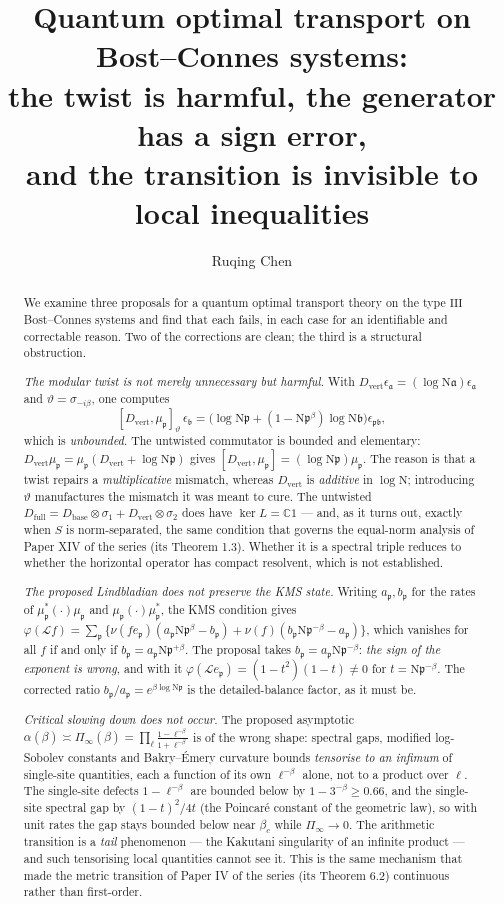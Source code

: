 \documentclass[11pt]{amsart}
\title[Twists, detailed balance, and tensorisation]{Quantum optimal transport on Bost--Connes systems:\\ the twist is harmful, the generator has a sign error,\\ and the transition is invisible to local inequalities}
\author{Ruqing Chen}
\date{}
\numberwithin{equation}{section}
\theoremstyle{definition}
\theoremstyle{remark}
\newcommand{\C}{\mathbb{C}}
\newcommand{\cL}{\mathcal{L}}
\newcommand{\pp}{\mathfrak{p}}
\newcommand{\aaa}{\mathfrak{a}}
\newcommand{\bb}{\mathfrak{b}}
\newcommand{\Ns}{\mathrm{N}}
\newcommand{\Db}{D_{\mathrm{base}}}
\newcommand{\Dv}{D_{\mathrm{vert}}}
\newcommand{\Df}{D_{\mathrm{full}}}
\begin{document}
\begin{abstract}
We examine three proposals for a quantum optimal transport theory on the type $\mathrm{III}$
Bost--Connes systems and find that each fails, in each case for an identifiable and
correctable reason. Two of the corrections are clean; the third is a structural obstruction.

\emph{The modular twist is not merely unnecessary but harmful.} With
$\Dv\epsilon_\aaa=(\log\Ns\aaa)\epsilon_\aaa$ and $\vartheta=\sigma_{-i\beta}$, one computes
\[
[\Dv,\mu_\pp]_\vartheta\,\epsilon_\bb=\bigl(\log\Ns\pp+(1-\Ns\pp^{\beta})\log\Ns\bb\bigr)\epsilon_{\pp\bb},
\]
which is \emph{unbounded}. The untwisted commutator is bounded and elementary:
$\Dv\mu_\pp=\mu_\pp(\Dv+\log\Ns\pp)$ gives $[\Dv,\mu_\pp]=(\log\Ns\pp)\mu_\pp$. The reason is
that a twist repairs a \emph{multiplicative} mismatch, whereas $\Dv$ is \emph{additive} in
$\log\Ns$; introducing $\vartheta$ manufactures the mismatch it was meant to cure. The
untwisted $\Df=\Db\otimes\sigma_1+\Dv\otimes\sigma_2$ does have $\ker L=\C1$ --- and, as it
turns out, exactly when $S$ is norm-separated, the same condition that governs the
equal-norm analysis of Paper XIV of the series (its Theorem 1.3). Whether it is a spectral
triple reduces to whether the horizontal operator has compact resolvent, which is not
established.

\emph{The proposed Lindbladian does not preserve the KMS state.} Writing $a_\pp,b_\pp$ for
the rates of $\mu_\pp^*(\cdot)\mu_\pp$ and $\mu_\pp(\cdot)\mu_\pp^*$, the KMS condition gives
$\varphi(\cL f)=\sum_\pp\{\nu(fe_\pp)(a_\pp\Ns\pp^{\beta}-b_\pp)+\nu(f)(b_\pp\Ns\pp^{-\beta}-a_\pp)\}$,
which vanishes for all $f$ if and only if $b_\pp=a_\pp\Ns\pp^{+\beta}$. The proposal takes
$b_\pp=a_\pp\Ns\pp^{-\beta}$: \emph{the sign of the exponent is wrong}, and with it
$\varphi(\cL e_\pp)=(1-t^2)(1-t)\ne0$ for $t=\Ns\pp^{-\beta}$. The corrected ratio
$b_\pp/a_\pp=e^{\beta\log\Ns\pp}$ is the detailed-balance factor, as it must be.

\emph{Critical slowing down does not occur.} The proposed asymptotic
$\alpha(\beta)\asymp\Pi_\infty(\beta)=\prod_{\ell}\frac{1-\ell^{-\beta}}{1+\ell^{-\beta}}$
is of the wrong shape: spectral gaps, modified log-Sobolev constants and Bakry--\'Emery
curvature bounds \emph{tensorise to an infimum} of single-site quantities, each a function
of its own $\ell^{-\beta}$ alone, not to a product over $\ell$. The single-site defects
$1-\ell^{-\beta}$ are bounded below by $1-3^{-\beta}\ge0.66$, and the single-site spectral
gap by $(1-t)^2/4t$ (the Poincar\'e constant of the geometric law), so with unit rates the
gap stays bounded below near $\beta_c$ while $\Pi_\infty\to0$. The arithmetic transition is
a \emph{tail} phenomenon --- the Kakutani singularity of an infinite product --- and such
tensorising local quantities cannot see it. This is the same mechanism that made the metric
transition of Paper IV of the series (its Theorem 6.2) continuous rather than first-order.
\end{abstract}
\end{document}

